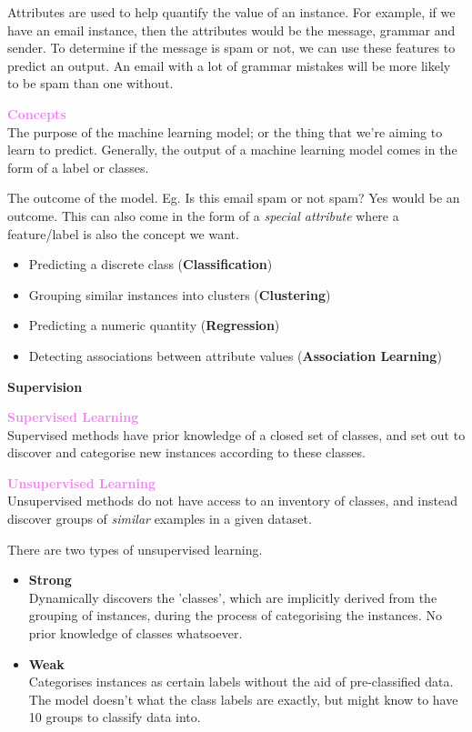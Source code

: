 \documentclass[a4paper,10pt]{article}
\begin{document}
\noindent Attributes are used to help quantify the value of an instance. For example, if we have an email instance, then the attributes would be the message, grammar and sender. To determine if the message is spam or not, we can use these features to predict an output. An email with a lot of grammar mistakes will be more likely to be spam than one without. 
\begin{shaded}
	\noindent \textcolor{Violet}{\textbf{Concepts}} \\
	The purpose of the machine learning model; or the thing that we're aiming to learn to predict. Generally, the output of a machine learning model comes in the form of a label or classes. 
\end{shaded} 
\noindent The outcome of the model. Eg. Is this email spam or not spam? Yes would be an outcome. This can also come in the form of a \emph{special attribute} where a feature/label is also the concept we want. \\
\begin{itemize}
	\item Predicting a discrete class (\textbf{Classification})
	\item Grouping similar instances into clusters (\textbf{Clustering})
	\item Predicting a numeric quantity (\textbf{Regression})
	\item Detecting associations between attribute values (\textbf{Association Learning})
\end{itemize}
\textcolor{Periwinkle}{\textbf{Supervision}}
\begin{shaded}
	\noindent \textcolor{Violet}{\textbf{Supervised Learning}} \\
	Supervised methods have prior knowledge of a closed set of classes, and set out to discover and categorise new instances according to these classes. 
\end{shaded}
\begin{shaded}
	\noindent \textcolor{Violet}{\textbf{Unsupervised Learning}} \\
	Unsupervised methods do not have access to an inventory of classes, and instead discover groups of \emph{similar} examples in a given dataset.
\end{shaded}
\noindent There are two types of unsupervised learning. 
\begin{itemize}
	\item \textbf{Strong} \\
	Dynamically discovers the 'classes', which are implicitly derived from the grouping of instances, during the process of categorising the instances. No prior knowledge of classes whatsoever. 
	\item \textbf{Weak} \\
	Categorises instances as certain labels without the aid of pre-classified data. The model doesn't what the class labels are exactly, but might know to have 10 groups to classify data into. \\
\end{itemize}
\end{document}
